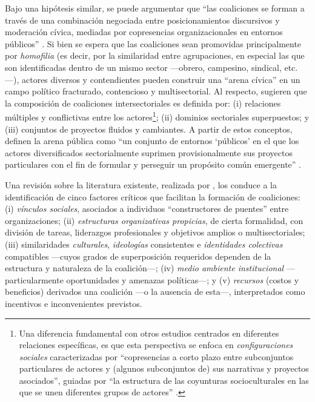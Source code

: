 \documentclass[letterpaper, 11pt]{book}
\theoremstyle{definition}
\theoremstyle{remark}
\begin{document}
Bajo una hipótesis similar, se puede argumentar que ``las coaliciones se forman a través de una combinación negociada entre posicionamientos discursivos y moderación cívica, mediadas por copresencias organizacionales en entornos públicos'' \citep[188]{2000_MischePattison_civicArena}. 
Si bien se espera que las coaliciones sean promovidas principalmente por \emph{homofilia} (es decir, por la similaridad entre agrupaciones, en especial las que son identificadas dentro de un mismo sector ---obrero, campesino, sindical, etc.---), actores diversos y contendientes pueden construir una ``arena cívica'' en un campo político fracturado, contencioso y multisectorial. 
Al respecto, \citet{2000_MischePattison_civicArena} sugieren que la composición de coaliciones intersectoriales es definida por: 
(i) relaciones múltiples y conflictivas entre los actores\footnote{
    Una diferencia fundamental con otros estudios centrados en diferentes relaciones específicas, es que esta perspectiva se enfoca en \emph{configuraciones sociales} caracterizadas por ``copresencias a corto plazo entre subconjuntos particulares de actores y (algunos subconjuntos de) sus narrativas y proyectos asociados'', guiadas por ``la estructura de las coyunturas socioculturales en las que se unen diferentes grupos de actores'' \citep[167]{2000_MischePattison_civicArena}.
}; 
(ii) dominios sectoriales superpuestos; y 
(iii) conjuntos de proyectos fluidos y cambiantes. 
A partir de estos conceptos, definen la arena pública como ``un conjunto de entornos `públicos' en el que los actores diversificados sectorialmente suprimen provisionalmente sus proyectos particulares con el fin de formular y perseguir un propósito común emergente'' \citep[168]{2000_MischePattison_civicArena}. 


Una revisión sobre la literatura existente, realizada por \citet{2017_VanDykeANDamos_SocialMovementCoalitions}, los conduce a la identificación de cinco factores críticos que facilitan la formación de coaliciones: 
(i) \emph{vínculos sociales}, asociados a individuos ``constructores de puentes'' entre organizaciones; 
(ii) \emph{estructuras organizativas propicias}, de cierta formalidad, con división de tareas, liderazgos profesionales y objetivos amplios o multisectoriales; 
(iii) similaridades \emph{culturales}, \emph{ideologías} consistentes e \emph{identidades colectivas} compatibles ---cuyos grados de superposición requeridos dependen de la estructura y naturaleza de la coalición---; 
(iv) \emph{medio ambiente institucional} ---particularmente oportunidades y amenazas políticas---; 
y (v) \emph{recursos} (costos y beneficios) derivados una coalición ---o la ausencia de esta---, interpretados como incentivos e inconvenientes previstos. 
\end{document}
